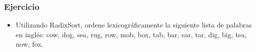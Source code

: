 \documentclass{beamer}
\begin{document}
\begin{frame}[fragile]
 \frametitle{Ejercicio}
\begin{itemize}
\item Utilizando RadixSort, ordene lexicográficamente la siguiente lista de palabras en inglés: cow, dog, sea, rug, row, mob, box, tab, bar, ear, tar, dig, big, tea, now, fox.
\end{itemize}
\end{frame}
\end{document}
